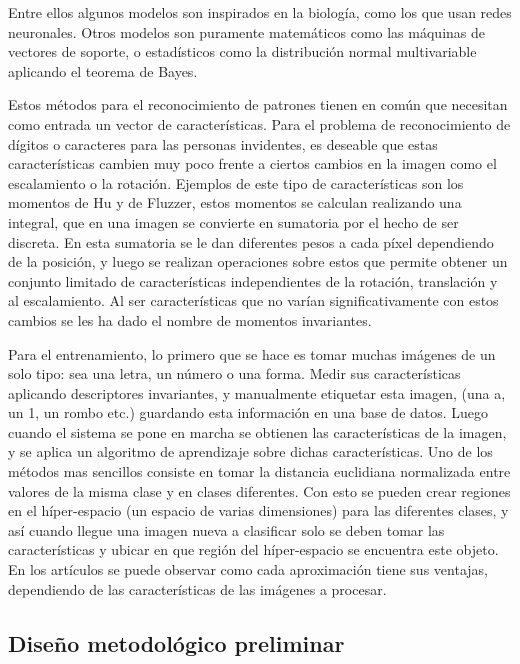 \documentclass[a4paper, 11pt, oneside]{article}
\begin{document}
	Entre ellos algunos modelos son inspirados en la biología, como los que usan redes neuronales.
    Otros modelos son puramente matemáticos como las máquinas de vectores de soporte, o estadísticos
	como la distribución normal multivariable aplicando el teorema de Bayes.

	
	Estos métodos para el reconocimiento de patrones tienen en común que necesitan como
	entrada un vector de características. Para el problema de reconocimiento de dígitos
	o caracteres para las personas invidentes, es deseable que estas características cambien
	muy poco frente a ciertos cambios en la imagen como el escalamiento o la rotación.
	Ejemplos de este tipo de características son los momentos de Hu y de Fluzzer, estos
	momentos se calculan realizando una integral, que en una imagen se convierte en sumatoria
	por el hecho de ser discreta. En esta sumatoria se le dan diferentes pesos a cada píxel
	dependiendo de la posición, y luego se realizan operaciones sobre estos que permite
	obtener un conjunto limitado de características independientes de la rotación, translación
	y al escalamiento. Al ser características que no varían significativamente con estos 
	cambios se les ha dado el nombre de momentos invariantes.
	
	Para el entrenamiento, lo primero que se hace es tomar muchas imágenes de un solo tipo: sea una letra, un 
	número o una forma. Medir sus características aplicando descriptores invariantes, y manualmente 
    etiquetar esta imagen, (una a, un 1, un rombo etc.) guardando esta información en una base de
    datos. Luego cuando el sistema se pone en marcha se obtienen las características de la imagen,
    y se aplica un algoritmo de aprendizaje sobre dichas características. Uno de los métodos mas
	sencillos consiste en tomar la distancia euclidiana normalizada entre valores de la misma
	clase y en clases diferentes. Con esto se pueden crear regiones en el híper-espacio (un
	espacio de varias dimensiones) para las diferentes clases, y así cuando llegue una imagen
	nueva a clasificar solo se deben tomar las características y ubicar en que región del
	híper-espacio se encuentra este objeto. En los artículos se puede observar como  
	cada aproximación tiene sus ventajas, dependiendo de las características de las imágenes a
	procesar.
	\newpage
		
	\begin{center}
	\section{Diseño metodológico preliminar}
	\end{center}
	
\end{document}
